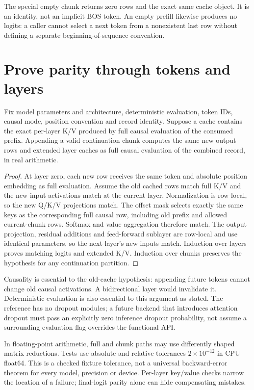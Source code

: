 The special empty chunk returns zero rows and the exact same cache object.
It is an identity, not an implicit BOS token. An empty prefill likewise
produces no logits: a caller cannot select a next token from a nonexistent
last row without defining a separate beginning-of-sequence convention.

\section{Prove parity through tokens and layers}
\label{evod35:proof}
\begin{proposition}
Fix model parameters and architecture, deterministic evaluation, token IDs,
causal mode, position convention and record identity. Suppose a cache contains
the exact per-layer K/V produced by full causal evaluation of the consumed
prefix. Appending a valid continuation chunk computes the same new output
rows and extended layer caches as full causal evaluation of the combined
record, in real arithmetic.
\end{proposition}
\begin{proof}
At layer zero, each new row receives the same token and absolute position
embedding as full evaluation. Assume the old cached rows match full K/V and
the new input activations match at the current layer. Normalization is
row-local, so the new Q/K/V projections match. The offset mask selects exactly
the same keys as the corresponding full causal row, including old prefix and
allowed current-chunk rows. Softmax and value aggregation therefore match.
The output projection, residual additions and feed-forward sublayer are
row-local and use identical parameters, so the next layer's new inputs match.
Induction over layers proves matching logits and extended K/V. Induction over
chunks preserves the hypothesis for any continuation partition.
\end{proof}

Causality is essential to the old-cache hypothesis: appending future tokens
cannot change old causal activations. A bidirectional layer would invalidate
it. Deterministic evaluation is also essential to this argument as stated.
The reference has no dropout modules; a future backend that introduces
attention dropout must pass an explicitly zero inference dropout probability,
not assume a surrounding evaluation flag overrides the functional API.

In floating-point arithmetic, full and chunk paths may use differently
shaped matrix reductions. Tests use absolute and relative tolerances
$2\times10^{-12}$ in CPU float64. This is a checked fixture tolerance,
not a universal backward-error theorem for every model, precision or device.
Per-layer key/value checks narrow the location of a failure; final-logit
parity alone can hide compensating mistakes.

